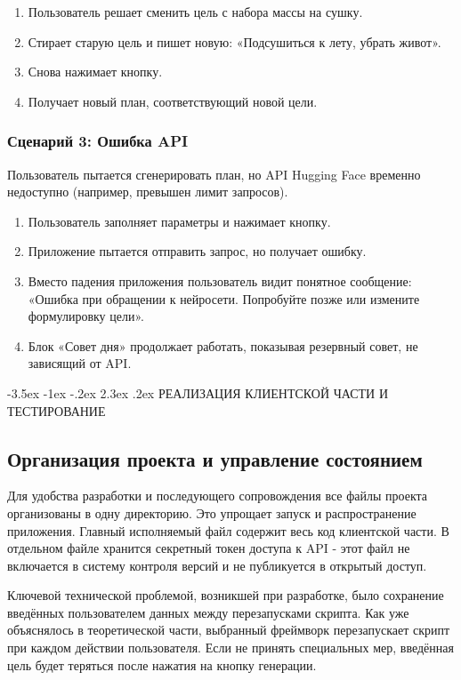 \documentclass[14pt, a4paper]{extarticle}
\makeatletter
\renewcommand\section{\@startsection {section}{1}{\z@}%
{-3.5ex \@plus -1ex \@minus -.2ex}%
{2.3ex \@plus.2ex}%
{\centering\normalfont\Large\bfseries}}
\makeatother
\begin{document}
\begin{enumerate}
\begin{enumerate}
\item Пользователь решает сменить цель с набора массы на сушку.
\item Стирает старую цель и пишет новую: «Подсушиться к лету, убрать живот».
\item Снова нажимает кнопку.
\item Получает новый план, соответствующий новой цели.
\end{enumerate}

\subsubsection{Сценарий 3: Ошибка API}

\noindent Пользователь пытается сгенерировать план, но API Hugging Face временно недоступно (например, превышен лимит запросов).

\begin{enumerate}
\item Пользователь заполняет параметры и нажимает кнопку.
\item Приложение пытается отправить запрос, но получает ошибку.
\item Вместо падения приложения пользователь видит понятное сообщение: «Ошибка при обращении к нейросети. Попробуйте позже или измените формулировку цели».
\item Блок «Совет дня» продолжает работать, показывая резервный совет, не зависящий от API.
\end{enumerate}

\newpage
\section{РЕАЛИЗАЦИЯ КЛИЕНТСКОЙ ЧАСТИ И ТЕСТИРОВАНИЕ}

\subsection{Организация проекта и управление состоянием}

\noindent Для удобства разработки и последующего сопровождения все файлы проекта организованы в одну директорию. Это упрощает запуск и распространение приложения. Главный исполняемый файл содержит весь код клиентской части. В отдельном файле хранится секретный токен доступа к API - этот файл не включается в систему контроля версий и не публикуется в открытый доступ.

\medskip
\noindent Ключевой технической проблемой, возникшей при разработке, было сохранение введённых пользователем данных между перезапусками скрипта. Как уже объяснялось в теоретической части, выбранный фреймворк перезапускает скрипт при каждом действии пользователя. Если не принять специальных мер, введённая цель будет теряться после нажатия на кнопку генерации.


\end{enumerate}
\end{document}
